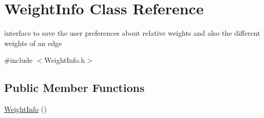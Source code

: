 \hypertarget{class_weight_info}{}\section{Weight\+Info Class Reference}
\label{class_weight_info}


interface to save the user preferences about relative weights and also the different weights of an edge  




{\ttfamily \#include $<$Weight\+Info.\+h$>$}

\subsection*{Public Member Functions}
\begin{DoxyCompactItemize}
\item 
\hypertarget{class_weight_info_a926aa00bc0d9e6cc9007c9ec06bc9b73}{}\hyperlink{class_weight_info_a926aa00bc0d9e6cc9007c9ec06bc9b73}{Weight\+Info} ()\label{class_weight_info_a926aa00bc0d9e6cc9007c9ec06bc9b73}


\end{DoxyCompactItemize}
